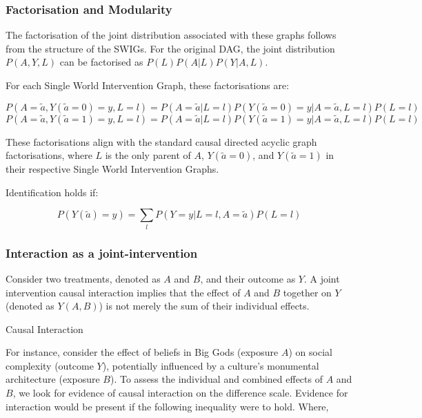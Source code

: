 \documentclass[
  single column]{article}
\begin{document}
\subsubsection{Factorisation and
Modularity}\label{factorisation-and-modularity}

The factorisation of the joint distribution associated with these graphs
follows from the structure of the SWIGs. For the original DAG, the joint
distribution \(P(A, Y, L)\) can be factorised as \(P(L)P(A|L)P(Y|A,L)\).

For each Single World Intervention Graph, these factorisations are:

\[
P(A = \tilde{a}, Y(\tilde{a}=0) = y, L = l) = P(A = \tilde{a}|L = l)P(Y(\tilde{a}=0) = y|A = \tilde{a}, L = l)P(L = l)
\] \[
P(A = \tilde{a}, Y(\tilde{a}=1) = y, L = l) = P(A = \tilde{a}|L = l)P(Y(\tilde{a}=1) = y|A = \tilde{a}, L = l)P(L = l)
\]

These factorisations align with the standard causal directed acyclic
graph factorisations, where \(L\) is the only parent of \(A\),
\(Y(\tilde{a}=0)\), and \(Y(\tilde{a}=1)\) in their respective Single
World Intervention Graphs.

Identification holds if:

\[
P(Y(\tilde{a}) = y) = \sum_l P(Y = y|L = l, A = \tilde{a}) P(L = l)
\]

\subsubsection{Interaction as a
joint-intervention}\label{interaction-as-a-joint-intervention}

Consider two treatments, denoted as \(A\) and \(B\), and their outcome
as \(Y\). A joint intervention causal interaction implies that the
effect of \(A\) and \(B\) together on \(Y\) (denoted as \(Y(A,B)\)) is
not merely the sum of their individual effects.

\begin{table}

\caption{\label{tbl-interactionpuzzle}Causal Interaction}

\centering{

\interactionpuzzle

}

\end{table}%

For instance, consider the effect of beliefs in Big Gods (exposure
\(A\)) on social complexity (outcome \(Y\)), potentially influenced by a
culture's monumental architecture (exposure \(B\)). To assess the
individual and combined effects of \(A\) and \(B\), we look for evidence
of causal interaction on the difference scale. Evidence for interaction
would be present if the following inequality were to hold. Where,
\end{document}
